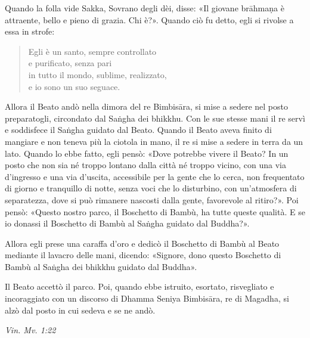 Quando la folla vide Sakka, Sovrano degli dèi, disse: «Il giovane
brāhmaṇa è attraente, bello e pieno di grazia. Chi è?». Quando ciò fu
detto, egli si rivolse a essa in strofe:


\begin{quotation}
Egli è un santo, sempre controllato \\
e purificato, senza pari \\
in tutto il mondo, sublime, realizzato, \\
e io sono un suo seguace.
\end{quotation}

Allora il Beato andò nella dimora del re Bimbisāra, si mise a sedere nel
posto preparatogli, circondato dal Saṅgha dei bhikkhu. Con le sue stesse
mani il re servì e soddisfece il Saṅgha guidato dal Beato. Quando il
Beato aveva finito di mangiare e non teneva più la ciotola in mano, il
re si mise a sedere in terra da un lato. Quando lo ebbe fatto, egli
pensò: «Dove potrebbe vivere il Beato? In un posto che non sia né troppo
lontano dalla città né troppo vicino, con una via d’ingresso e una via
d’uscita, accessibile per la gente che lo cerca, non frequentato di
giorno e tranquillo di notte, senza voci che lo disturbino, con
un’atmosfera di separatezza, dove si può rimanere nascosti dalla gente,
favorevole al ritiro?». Poi pensò: «Questo nostro parco, il Boschetto di
Bambù, ha tutte queste qualità. E se io donassi il Boschetto di Bambù al
Saṅgha guidato dal Buddha?».


Allora egli prese una caraffa d’oro e dedicò il Boschetto di Bambù al
Beato mediante il lavacro delle mani, dicendo: «Signore, dono questo
Boschetto di Bambù al Saṅgha dei bhikkhu guidato dal Buddha».


Il Beato accettò il parco. Poi, quando ebbe istruito, esortato,
risvegliato e incoraggiato con un discorso di Dhamma Seniya Bimbisāra,
re di Magadha, si alzò dal posto in cui sedeva e se ne andò.


\emph{Vin. Mv. 1:22}


